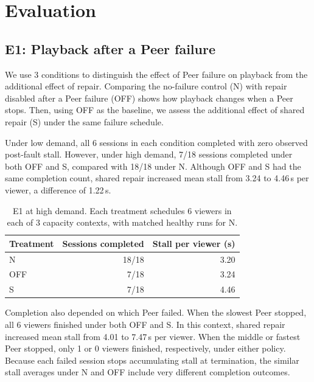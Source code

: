 \section{Evaluation}
\label{sec:evaluation}

\subsection{E1: Playback after a Peer failure}
We use 3 conditions to distinguish the effect of Peer failure on playback
from the additional effect of repair. Comparing the no-failure control (N)
with repair disabled after a Peer failure (OFF) shows how playback changes
when a Peer stops. 
Then, using OFF as the baseline, we assess the additional effect of
shared repair (S) under the same failure schedule.

Under low demand, all 6 sessions in each condition completed with zero observed post-fault stall. 
However, under high demand, 7/18 sessions completed under both OFF and S, 
compared with 18/18 under N.
Although OFF and S had the same completion count, shared repair increased
mean stall from 3.24 to 4.46\,s per viewer, a difference
of 1.22\,s.

\begin{table}[ht]
\centering\small
\caption{E1 at high demand. Each treatment schedules 6 viewers in each of
3 capacity contexts, with matched healthy runs for N.}
\label{tab:e1}
\begin{tabular}{@{}lrr@{}}
\toprule
Treatment & Sessions completed & Stall per viewer (s) \\
\midrule
N & 18/18 & 3.20 \\
OFF & 7/18 & 3.24 \\
S & 7/18 & 4.46 \\
\bottomrule
\end{tabular}
\end{table}

Completion also depended on which Peer failed. When the slowest Peer
stopped, all 6 viewers finished under both OFF and S. In this context,
shared repair increased mean stall from 4.01 to 7.47\,s per viewer.
When the middle or fastest Peer stopped, only 1 or 0 viewers finished,
respectively, under either policy. Because each failed session stops
accumulating stall at termination, the similar stall averages under N
and OFF include very different completion outcomes.

